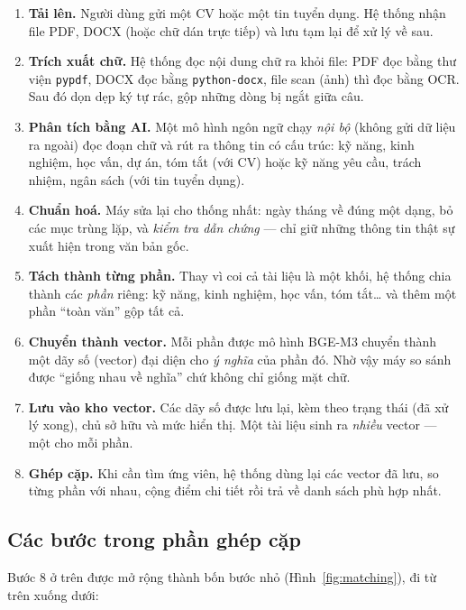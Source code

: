 \documentclass[a4paper,11pt]{article}
\begin{document}
\begin{enumerate}[leftmargin=1.6em]
  \item \textbf{Tải lên.} Người dùng gửi một CV hoặc một tin tuyển dụng. Hệ thống nhận
        file PDF, DOCX (hoặc chữ dán trực tiếp) và lưu tạm lại để xử lý về sau.
  \item \textbf{Trích xuất chữ.} Hệ thống đọc nội dung chữ ra khỏi file: PDF đọc bằng
        thư viện \texttt{pypdf}, DOCX đọc bằng \texttt{python-docx}, file scan (ảnh) thì
        đọc bằng OCR. Sau đó dọn dẹp ký tự rác, gộp những dòng bị ngắt giữa câu.
  \item \textbf{Phân tích bằng AI.} Một mô hình ngôn ngữ chạy \emph{nội bộ} (không gửi
        dữ liệu ra ngoài) đọc đoạn chữ và rút ra thông tin có cấu trúc: kỹ năng, kinh
        nghiệm, học vấn, dự án, tóm tắt (với CV) hoặc kỹ năng yêu cầu, trách nhiệm, ngân
        sách (với tin tuyển dụng).
  \item \textbf{Chuẩn hoá.} Máy sửa lại cho thống nhất: ngày tháng về đúng một dạng, bỏ
        các mục trùng lặp, và \emph{kiểm tra dẫn chứng} --- chỉ giữ những thông tin thật
        sự xuất hiện trong văn bản gốc.
  \item \textbf{Tách thành từng phần.} Thay vì coi cả tài liệu là một khối, hệ thống
        chia thành các \emph{phần} riêng: kỹ năng, kinh nghiệm, học vấn, tóm tắt\dots{}
        và thêm một phần ``toàn văn'' gộp tất cả.
  \item \textbf{Chuyển thành vector.} Mỗi phần được mô hình BGE-M3 chuyển thành một dãy
        số (vector) đại diện cho \emph{ý nghĩa} của phần đó. Nhờ vậy máy so sánh được
        ``giống nhau về nghĩa'' chứ không chỉ giống mặt chữ.
  \item \textbf{Lưu vào kho vector.} Các dãy số được lưu lại, kèm theo trạng thái (đã
        xử lý xong), chủ sở hữu và mức hiển thị. Một tài liệu sinh ra \emph{nhiều} vector
        --- một cho mỗi phần.
  \item \textbf{Ghép cặp.} Khi cần tìm ứng viên, hệ thống dùng lại các vector đã lưu,
        so từng phần với nhau, cộng điểm chi tiết rồi trả về danh sách phù hợp nhất.
\end{enumerate}

\subsection{Các bước trong phần ghép cặp}

Bước 8 ở trên được mở rộng thành bốn bước nhỏ (Hình~\ref{fig:matching}), đi từ trên
xuống dưới:
\end{document}
